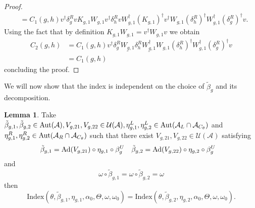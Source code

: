 \documentclass[12pt,a4paper,twoside]{article}
\let\originalleft\left
\let\originalright\right
\renewcommand{\left}{\mathopen{}\mathclose\bgroup\originalleft}
\renewcommand{\right}{\aftergroup\egroup\originalright}
\newcommand{\UU}{\mathcal U}
\renewcommand{\AA}{\mathcal A}
\newcommand{\Ad}[1]{\textrm{Ad}\left(#1\right)}
\newcommand{\Aut}[1]{\textrm{Aut}\left(#1\right)}
\theoremstyle{definition}
\newtheorem{lemma}[theorem]{Lemma}
\numberwithin{equation}{section}
\begin{document}
\begin{proof}
\begin{align}
		&=C_1(g,h)v^\dagger \delta_g^R v K_{g,1} W_{g,1}v^\dagger \delta_h^R v W_{g,1}^\dagger (K_{g,1})^\dagger v^\dagger W_{g,1}(\delta^R_h)^\dagger W_{g,1}^\dagger(\delta_g^R)^\dagger v.
	\end{align}
	Using the fact that by definition $K_{g,1}W_{g,1}=v^\dagger W_{g,1}v$ we obtain
	\begin{align}
		C_2(g,h)&=C_1(g,h)v^\dagger \delta_g^R \underline{W_{g,1}} \delta_h^R \underline{W_{g,1}^\dagger} W_{g,1}(\delta^R_h)^\dagger W_{g,1}^\dagger(\delta_g^R)^\dagger v\\
		&=C_1(g,h)
	\end{align}
	concluding the proof.
\end{proof}
We will now show that the index is independent on the choice of $\tilde{\beta}_g$ and its decomposition.
\begin{lemma}\label{lem:InvarianceUnderChoiceBeta}
	Take $\tilde{\beta}_{g,1},\tilde{\beta}_{g,2}\in\Aut{\AA},V_{g,21},V_{g,22}\in\UU(\AA),\eta_{g,1}^L,\eta_{g,2}^L\in \Aut{\AA_L\cap\AA_{C_\theta}}$ and $\eta_{g,1}^R,\eta_{g,2}^R\in \Aut{\AA_R\cap\AA_{C_\theta}}$ such that there exist $V_{g,21},V_{g,22}\in\UU(\AA)$ satisfying
	\begin{align}\label{eq:InvarianceUnderChoiceBetaTwoBetas}
		\tilde{\beta}_{g,1}&=\Ad{V_{g,21}}\circ\eta_{g,1}\circ\beta^U_g&\tilde{\beta}_{g,2}&=\Ad{V_{g,22}}\circ\eta_{g,2}\circ\beta^U_g
	\end{align}
	and
	\begin{equation}
		\omega\circ\tilde{\beta}_{g,1}=\omega\circ\tilde{\beta}_{g,2}=\omega
	\end{equation}
	then
	\begin{equation}
		\textrm{Index}(\theta,\tilde{\beta}_{g,1},\eta_{g,1},\alpha_{0},\Theta,\omega,\omega_0)=\textrm{Index}(\theta,\tilde{\beta}_{g,2},\eta_{g,2},\alpha_{0},\Theta,\omega,\omega_0).
	\end{equation}
\end{lemma}
\end{document}
